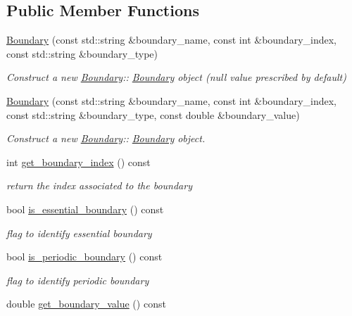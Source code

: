 \subsection*{Public Member Functions}
\begin{DoxyCompactItemize}
\item 
\hyperlink{classBoundary_a145bbf70e6907e3d5ae3a5ac33b4bb2b}{Boundary} (const std\+::string \&boundary\+\_\+name, const int \&boundary\+\_\+index, const std\+::string \&boundary\+\_\+type)
\begin{DoxyCompactList}\small\item\em Construct a new \hyperlink{classBoundary}{Boundary}\+:\+: \hyperlink{classBoundary}{Boundary} object (null value prescribed by default) \end{DoxyCompactList}\item 
\hyperlink{classBoundary_a60ec4ca219af885067b7583a92d2a2d1}{Boundary} (const std\+::string \&boundary\+\_\+name, const int \&boundary\+\_\+index, const std\+::string \&boundary\+\_\+type, const double \&boundary\+\_\+value)
\begin{DoxyCompactList}\small\item\em Construct a new \hyperlink{classBoundary}{Boundary}\+:\+: \hyperlink{classBoundary}{Boundary} object. \end{DoxyCompactList}\item 
int \hyperlink{classBoundary_a8a73f9a2cb9f798a3adc4d9dab58610b}{get\+\_\+boundary\+\_\+index} () const
\begin{DoxyCompactList}\small\item\em return the index associated to the boundary \end{DoxyCompactList}\item 
bool \hyperlink{classBoundary_ab367015ba9c9fc55528032cb5b9eca95}{is\+\_\+essential\+\_\+boundary} () const
\begin{DoxyCompactList}\small\item\em flag to identify essential boundary \end{DoxyCompactList}\item 
bool \hyperlink{classBoundary_a3050c65c13641207ee776309baec08ff}{is\+\_\+periodic\+\_\+boundary} () const
\begin{DoxyCompactList}\small\item\em flag to identify periodic boundary \end{DoxyCompactList}\item 
double \hyperlink{classBoundary_afbd4effd911d4a699bb33d48b5f9396b}{get\+\_\+boundary\+\_\+value} () const

\end{DoxyCompactItemize}
